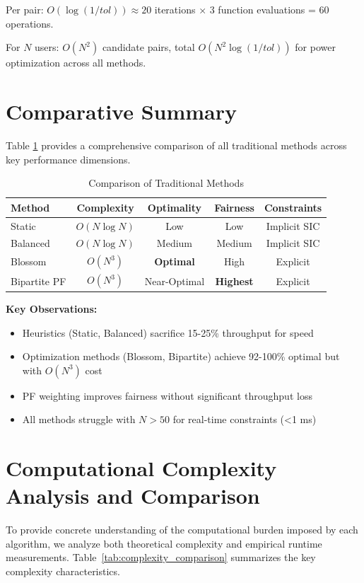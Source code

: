 Per pair: $O(\log(1/tol)) \approx 20$ iterations × 3 function evaluations = 60 operations.

For $N$ users: $O(N^2)$ candidate pairs, total $O(N^2 \log(1/tol))$ for power optimization across all methods.

\section{Comparative Summary}

Table \ref{tab:trad_methods} provides a comprehensive comparison of all traditional methods across key performance dimensions.

\begin{table}[H]
\centering
\caption{Comparison of Traditional Methods}
\label{tab:trad_methods}
\begin{tabular}{lcccc}
\toprule
\textbf{Method} & \textbf{Complexity} & \textbf{Optimality} & \textbf{Fairness} & \textbf{Constraints} \\
\midrule
Static & $O(N \log N)$ & Low & Low & Implicit SIC \\
Balanced & $O(N \log N)$ & Medium & Medium & Implicit SIC \\
Blossom & $O(N^3)$ & \textbf{Optimal} & High & Explicit \\
Bipartite PF & $O(N^3)$ & Near-Optimal & \textbf{Highest} & Explicit \\
\bottomrule
\end{tabular}
\end{table}

\textbf{Key Observations:}
\begin{itemize}
    \item Heuristics (Static, Balanced) sacrifice 15-25\% throughput for speed
    \item Optimization methods (Blossom, Bipartite) achieve 92-100\% optimal but with $O(N^3)$ cost
    \item PF weighting improves fairness without significant throughput loss
    \item All methods struggle with $N > 50$ for real-time constraints (<1 ms)
\end{itemize}

\section{Computational Complexity Analysis and Comparison}

To provide concrete understanding of the computational burden imposed by each algorithm, we analyze both theoretical complexity and empirical runtime measurements. Table~\ref{tab:complexity_comparison} summarizes the key complexity characteristics.

